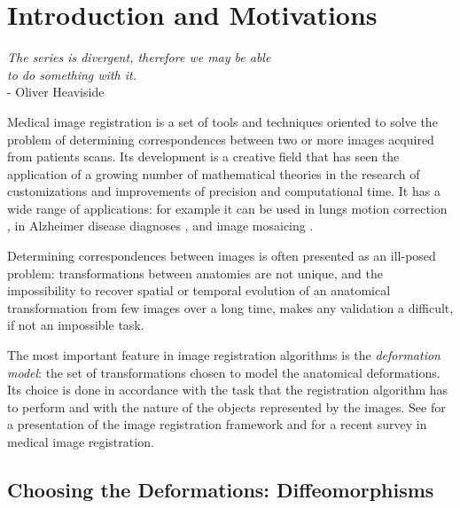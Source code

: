 \chapter{Introduction and Motivations}\label{ch:introduction}


\begin{flushright}
		\emph{The series is divergent, therefore we may be able \\ to do something with it.}\\
			- Oliver Heaviside
\end{flushright}

\vspace{0.6cm}


Medical image registration is a set of tools and techniques oriented to solve the problem of determining correspondences between two or more images acquired from patients scans. Its development is a creative field that has seen the application of a growing number of mathematical theories in the research of customizations and improvements of precision and computational time. It has a wide range of applications: for example it can be used in lungs motion correction \cite{mcclelland,mcclelland2011inter}, in Alzheimer disease diagnoses \cite{prados2015measuring, fox1997brain, gauthier2012prevention}, and image mosaicing \cite{vercauteren2006robust, szeliski1994image}.  

Determining correspondences between images is often presented as an ill-posed problem: transformations between anatomies are not unique, and the impossibility to recover spatial or temporal evolution of an anatomical transformation from few images over a long time, makes any validation a difficult, if not an impossible task. 

The most important feature in image registration algorithms is the \emph{deformation model}: the set of transformations chosen to model the anatomical deformations. Its choice is done in accordance with the task that the registration algorithm has to perform and with the nature of the objects represented by the images. See \cite{ibanez2003itk} for a presentation of the image registration framework and \cite{Sotiras:survey:13} for a recent survey in medical image registration. 

\section{Choosing the Deformations: Diffeomorphisms}

